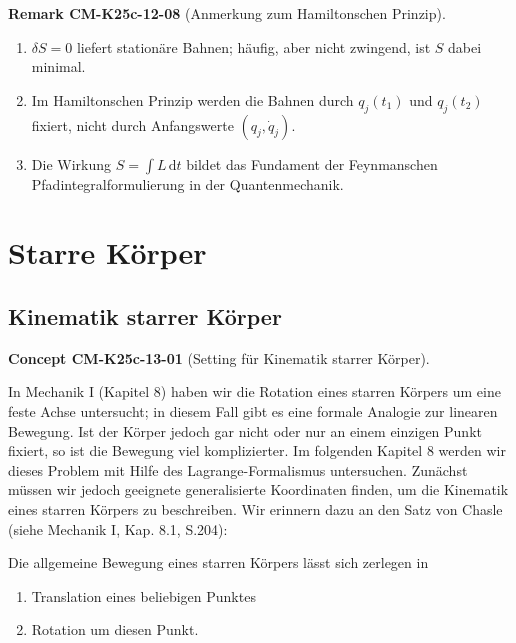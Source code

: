 \documentclass[10pt, letterpaper]{article}
\newcommand{\CustomHeading}[3]{%
  \par\medskip\noindent%
  \textbf{#1 #2} \textnormal{(#3)}.\enskip%
}
\newenvironment{REM}[2]{\CustomHeading{Remark}{#1}{#2}}{}
\newenvironment{CONC}[2]{\CustomHeading{Concept}{#1}{#2}}{}
\begin{document}
\begin{REM}{CM-K25c-12-08}{Anmerkung zum Hamiltonschen Prinzip}
\begin{enumerate}
  \item $\delta S=0$ liefert stationäre Bahnen; häufig,
        aber nicht zwingend, ist $S$ dabei minimal.
  \item Im Hamiltonschen Prinzip werden die Bahnen durch
        $q_j(t_1)$ und $q_j(t_2)$ fixiert, nicht durch
        Anfangswerte $(q_j,\dot q_j)$.
  \item Die Wirkung
        $S=\int L\,\mathrm dt$
        bildet das Fundament der Feynmanschen Pfadintegralformulierung
        in der Quantenmechanik.
\end{enumerate}
\end{REM}

\section{Starre Körper}

\subsection{Kinematik starrer Körper}

\begin{CONC}{CM-K25c-13-01}{Setting für Kinematik starrer Körper}
In Mechanik I (Kapitel 8) haben wir die Rotation eines starren Körpers um eine feste Achse untersucht; in diesem Fall gibt es eine formale Analogie zur linearen Bewegung. Ist der Körper jedoch gar nicht oder nur an einem einzigen Punkt fixiert, so ist die Bewegung viel komplizierter. Im folgenden Kapitel 8 werden wir dieses Problem mit Hilfe des Lagrange-Formalismus untersuchen. Zunächst müssen wir jedoch geeignete generalisierte Koordinaten finden, um die Kinematik eines starren Körpers zu beschreiben. Wir erinnern dazu an den Satz von Chasle (siehe Mechanik I, Kap. 8.1, S.204):

Die allgemeine Bewegung eines starren Körpers lässt sich zerlegen in
\begin{enumerate}
\item Translation eines beliebigen Punktes
\item Rotation um diesen Punkt.
\end{enumerate}
\end{CONC}
\end{document}
